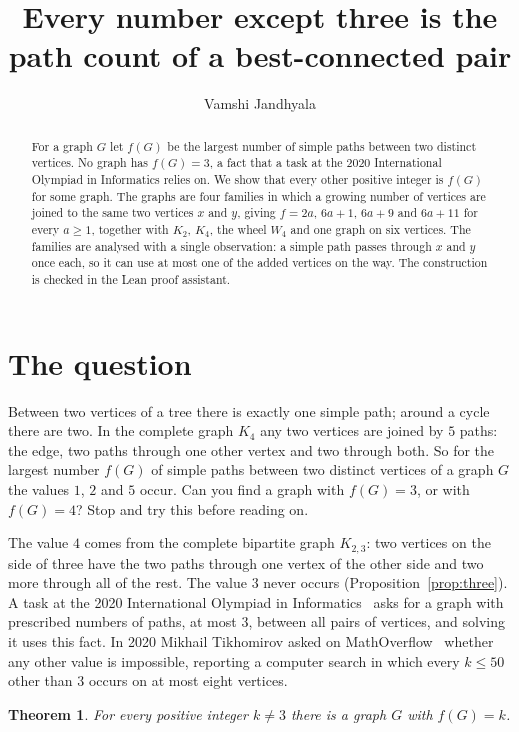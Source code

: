 \documentclass[11pt]{article}
\title{Every number except three is the path count of a best-connected pair}
\author{Vamshi Jandhyala}
\date{}
\newtheorem{theorem}{Theorem}
\theoremstyle{remark}
\begin{document}
\maketitle
\vspace{-2em}

\begin{abstract}
For a graph $G$ let $f(G)$ be the largest number of simple paths between two distinct vertices. No graph has
$f(G)=3$, a fact that a task at the 2020 International Olympiad in Informatics relies on. We show that every other
positive integer is $f(G)$ for some graph. The graphs are four families in which a growing number of vertices
are joined to the same two vertices $x$ and $y$, giving $f=2a$, $6a+1$, $6a+9$ and $6a+11$ for every $a\ge1$,
together with $K_2$, $K_4$, the wheel $W_4$ and one graph on six vertices. The families are analysed with a
single observation: a simple path passes through $x$ and $y$ once each, so it can use at most one of the added
vertices on the way. The construction is checked in the Lean proof assistant.
\end{abstract}

\section{The question}

Between two vertices of a tree there is exactly one simple path; around a cycle there are two. In the complete
graph $K_4$ any two vertices are joined by $5$ paths: the edge, two paths through one other vertex and two
through both. So for the largest number $f(G)$ of simple paths between two distinct vertices of a graph $G$
the values $1$, $2$ and $5$ occur. Can you find a graph with $f(G)=3$, or with $f(G)=4$? Stop and try this
before reading on.

The value $4$ comes from the complete bipartite graph $K_{2,3}$: two vertices on the side of three have the two
paths through one vertex of the other side and two more through all of the rest. The value $3$ never occurs
(Proposition~\ref{prop:three}). A task at the 2020 International Olympiad in Informatics~\cite{IOI} asks for a
graph with prescribed numbers of paths, at most $3$, between all pairs of vertices, and solving it uses this
fact. In 2020 Mikhail Tikhomirov asked on MathOverflow~\cite{MO} whether any other value is impossible,
reporting a computer search in which every $k\le50$ other than $3$ occurs on at most eight vertices.

\begin{theorem}\label{thm:main}
For every positive integer $k\ne3$ there is a graph $G$ with $f(G)=k$.
\end{theorem}
\end{document}
